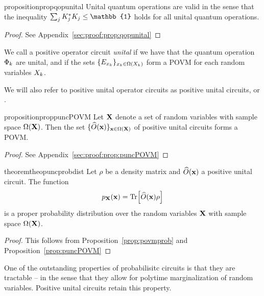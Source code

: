 \begin{restatable}{proposition}{propqopunital}
	\label{prop:qopunital}
	Unital quantum operations are valid in the sense that the inequality $\sum_j \kraus_{j}^* \kraus_{j} \leq \mathbb{1}$ holds for all unital quantum operations.
\end{restatable}

\begin{proof}
	See Appendix~\ref{sec:proof:prop:qopunital}
\end{proof}


\begin{definition}
	We call a positive operator circuit \textit{unital} if we have that the quantum operation $\Phi_k$ are unital, and if the sets $\{ E_{x_k} \}_{x_k \in \Omega(X_k)}$ form a POVM for each random variables $X_k$.
\end{definition}
We will also refer to positive unital operator circuits as positive unital circuits, or \puncs.


\begin{restatable}{proposition}{proppuncPOVM}
	\label{prop:puncPOVM}
	Let $\mathbf{X}$ denote a set of random variables with sample space $\Omega(\mathbf{X})$.
	Then the set $\{ \widehat{O}(\mathbf{x})\}_{\mathbf{x} \in \Omega(\mathbf{X})}$ of positive unital circuits forms a POVM.
\end{restatable}

\begin{proof}
	See Appendix~\ref{sec:proof:prop:puncPOVM}
\end{proof}




\begin{restatable}{theorem}{theopuncprobdist}
	\label{theo:puncprobdist}
	Let $\rho$ be a density matrix and $\widehat{O}(\mathbf{x})$ a positive unital circuit. The function
	\begin{align}
		p_{\mathbf{X}}(\mathbf{x}) = \Tr [\widehat{O}(\mathbf{x}) \rho]
		\label{eq:theo:prob_operator}
	\end{align}
	is a proper probability distribution over the random variables $\mathbf{X}$ with sample space $\Omega(\mathbf{X})$.
\end{restatable}

\begin{proof}
	This follows from Proposition~\ref{prop:povmprob} and Proposition~\ref{prop:puncPOVM}
\end{proof}

One of the outstanding properties of probabilisitc circuits is that they are tractable -- in the sense that they allow for polytime marginalization of random variables. Positive unital circuits retain this property.

